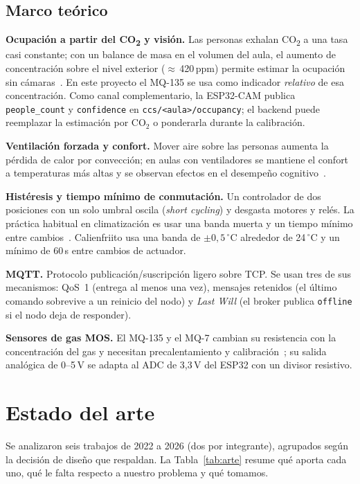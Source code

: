 \documentclass[10pt,a4paper]{article}
\newcommand{\cod}[1]{\texttt{\small #1}}
\newcommand{\COd}{CO\textsubscript{2}}
\begin{document}
\subsection{Marco teórico}
\textbf{Ocupación a partir del \COd{} y visión.} Las personas exhalan \COd{} a una tasa casi constante; con un balance de masa en el volumen del aula, el aumento de concentración sobre el nivel exterior ($\approx$\,420\,ppm) permite estimar la ocupación sin cámaras~\cite{batterman}. En este proyecto el MQ-135 se usa como indicador \emph{relativo} de esa concentración. Como canal complementario, la ESP32-CAM publica \cod{people\_count} y \cod{confidence} en \cod{ccs/<aula>/occupancy}; el backend puede reemplazar la estimación por CO$_2$ o ponderarla durante la calibración.

\textbf{Ventilación forzada y confort.} Mover aire sobre las personas aumenta la pérdida de calor por convección; en aulas con ventiladores se mantiene el confort a temperaturas más altas y se observan efectos en el desempeño cognitivo~\cite{cen}.

\textbf{Histéresis y tiempo mínimo de conmutación.} Un controlador de dos posiciones con un solo umbral oscila (\emph{short cycling}) y desgasta motores y relés. La práctica habitual en climatización es usar una banda muerta y un tiempo mínimo entre cambios~\cite{shafrir}. Calienfriito usa una banda de $\pm0{,}5\,^\circ$C alrededor de 24\,$^\circ$C y un mínimo de 60\,s entre cambios de actuador.

\textbf{MQTT.} Protocolo publicación/suscripción ligero sobre TCP. Se usan tres de sus mecanismos: QoS~1 (entrega al menos una vez), mensajes retenidos (el último comando sobrevive a un reinicio del nodo) y \emph{Last Will} (el broker publica \cod{offline} si el nodo deja de responder).

\textbf{Sensores de gas MOS.} El MQ-135 y el MQ-7 cambian su resistencia con la concentración del gas y necesitan precalentamiento y calibración~\cite{rawdhan}; su salida analógica de 0--5\,V se adapta al ADC de 3,3\,V del ESP32 con un divisor resistivo.

\section{Estado del arte}
\label{sec:estado}
Se analizaron seis trabajos de 2022 a 2026 (dos por integrante), agrupados según la decisión de diseño que respaldan. La Tabla~\ref{tab:arte} resume qué aporta cada uno, qué le falta respecto a nuestro problema y qué tomamos.
\end{document}
